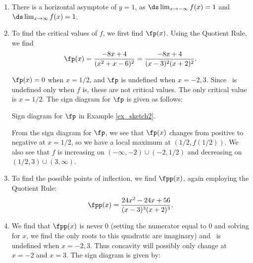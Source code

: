 {\begin{enumerate}
		\item		There is a horizontal asymptote of $y=1$, as $\ds \lim_{x\to -\infty}f(x) = 1$ and $\ds\lim_{x\to\infty}f(x) =1$.

		\item		To find the critical values of $f$, we first find $\fp(x)$. Using the Quotient Rule, we find 
\[
\fp(x) = \frac{-8x+4}{(x^2+x-6)^2} = \frac{-8x+4}{(x-3)^2(x+2)^2}.
\]
		
		$\fp(x) = 0$ when $x = 1/2$, and $\fp$ is undefined when $x=-2,3$. Since \fp\ is undefined only when $f$ is, these are not critical values. The only critical value is $x=1/2$. The sign diagram for $\fp$ is given as follows:
		
\noindent\begin{minipage}{\textwidth}
\begin{center}
\end{center}
\captionsetup{type=figure}%
			\caption{Sign diagram for $\fp$ in Example \ref{ex_sketch2}.}\label{fig:sketchline2fp}
\end{minipage}		
	
	From the sign diagram for $\fp$, we see that $\fp(x)$ changes from positive to negative at $x=1/2$, so we have a local maximum at $(1/2,f(1/2))$. We also see that $f$ is increasing on $(-\infty,-2)\cup(-2,1/2)$ and decreasing on $(1/2,3)\cup (3,\infty)$.
		
		\item		To find the possible points of inflection, we find $\fpp(x)$, again employing the Quotient Rule: 
\[
\fpp(x) = \frac{24x^2-24x+56}{(x-3)^3(x+2)^3}.
\]
		
		\item We find that $\fpp(x)$ is never 0 (setting the numerator equal to 0 and solving for $x$, we find the only roots to this quadratic are imaginary) and \fpp\ is undefined when $x=-2,3$. Thus concavity will possibly only change at $x=-2$ and $x=3$. The sign diagram is given by:


\end{enumerate}}
